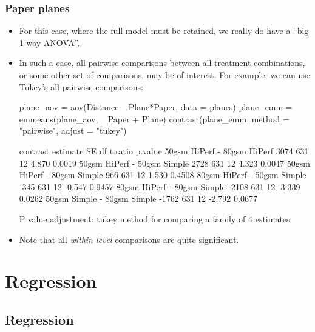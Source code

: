 \documentclass[a4paper]{article}\usepackage[]{graphicx}\usepackage[]{xcolor}
\begin{document}
\subsubsection{Paper planes}
\begin{itemize}
	\item For this case, where the full model must be retained, we really do have a ``big 1-way ANOVA''.
	\item In such a case, all pairwise comparisons between all treatment combinations, or some other set of comparisons, may be of interest. For example, we can use Tukey's all pairwise comparisons:
\begin{Schunk}
\begin{Sinput}
plane_aov = aov(Distance ~ Plane*Paper, data = planes)
plane_emm = emmeans(plane_aov,  ~ Paper + Plane)
contrast(plane_emm, method = "pairwise", adjust = "tukey")
\end{Sinput}
\begin{Soutput}
 contrast                    estimate  SE df t.ratio p.value
 50gsm HiPerf - 80gsm HiPerf     3074 631 12   4.870  0.0019
 50gsm HiPerf - 50gsm Simple     2728 631 12   4.323  0.0047
 50gsm HiPerf - 80gsm Simple      966 631 12   1.530  0.4508
 80gsm HiPerf - 50gsm Simple     -345 631 12  -0.547  0.9457
 80gsm HiPerf - 80gsm Simple    -2108 631 12  -3.339  0.0262
 50gsm Simple - 80gsm Simple    -1762 631 12  -2.792  0.0677

P value adjustment: tukey method for comparing a family of 4 estimates 
\end{Soutput}
\end{Schunk}
	\item Note that all \textit{within-level} comparisons are quite significant.
\end{itemize}

\section{Regression}\label{sec:26}
\subsection{Regression}
\end{document}
